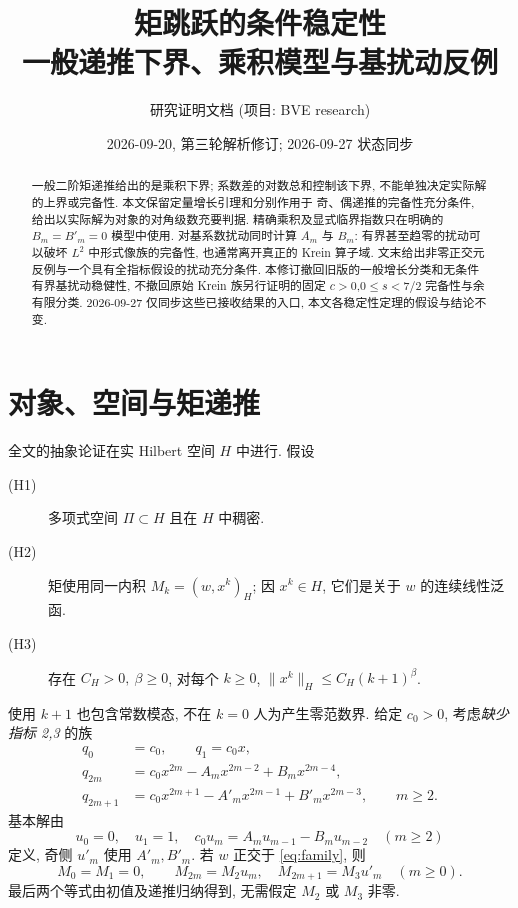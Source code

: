 \documentclass[UTF8]{ctexart}
\title{矩跳跃的条件稳定性\\ \large 一般递推下界、乘积模型与基扰动反例}
\author{研究证明文档 (项目: BVE research)}
\date{2026-09-20, 第三轮解析修订; 2026-09-27 状态同步}
\begin{document}
\maketitle
\begin{abstract}
一般二阶矩递推给出的是乘积下界; 系数差的对数总和控制该下界,
不能单独决定实际解的上界或完备性. 本文保留定量增长引理和分别作用于
奇、偶递推的完备性充分条件, 给出以实际解为对象的对角级数充要判据.
精确乘积及显式临界指数只在明确的 $B_m=B'_m=0$ 模型中使用.
对基系数扰动同时计算 $A_m$ 与 $B_m$: 有界甚至趋零的扰动可以破坏
$L^2$ 中形式像族的完备性, 也通常离开真正的 Krein 算子域.
文末给出非零正交元反例与一个具有全指标假设的扰动充分条件.
本修订撤回旧版的一般增长分类和无条件有界基扰动稳健性,
不撤回原始 Krein 族另行证明的固定 $c>0$,$0\le s<7/2$ 完备性与余有限分类.
2026-09-27 仅同步这些已接收结果的入口, 本文各稳定性定理的假设与结论不变.
\end{abstract}
\tableofcontents

\section{对象、空间与矩递推}

全文的抽象论证在实 Hilbert 空间 $H$ 中进行. 假设
\begin{description}
\item[(H1)] 多项式空间 $\Pi\subset H$ 且在 $H$ 中稠密.
\item[(H2)] 矩使用同一内积 $M_k=(w,x^k)_H$; 因 $x^k\in H$,
它们是关于 $w$ 的连续线性泛函.
\item[(H3)] 存在 $C_H>0,\ \beta\ge0$, 对每个 $k\ge0$,
$\|x^k\|_H\le C_H(k+1)^\beta$.
\end{description}
使用 $k+1$ 也包含常数模态, 不在 $k=0$ 人为产生零范数界.
给定 $c_0>0$, 考虑\emph{缺少指标 2,3} 的族
\begin{equation}\label{eq:family}
\begin{aligned}
q_0&=c_0,\qquad q_1=c_0x,\\
q_{2m}&=c_0x^{2m}-A_mx^{2m-2}+B_mx^{2m-4},\\
q_{2m+1}&=c_0x^{2m+1}-A'_mx^{2m-1}+B'_mx^{2m-3},
\qquad m\ge2 .
\end{aligned}
\end{equation}
基本解由
\begin{equation}\label{eq:recurrence}
u_0=0,\quad u_1=1,\quad
c_0u_m=A_mu_{m-1}-B_mu_{m-2}\quad(m\ge2)
\end{equation}
定义, 奇侧 $u'_m$ 使用 $A'_m,B'_m$.
若 $w$ 正交于 \eqref{eq:family}, 则
\begin{equation}\label{eq:moments}
M_0=M_1=0,\qquad M_{2m}=M_2u_m,\quad M_{2m+1}=M_3u'_m
\quad(m\ge0).
\end{equation}
最后两个等式由初值及递推归纳得到, 无需假定 $M_2$ 或 $M_3$ 非零.
\end{document}
